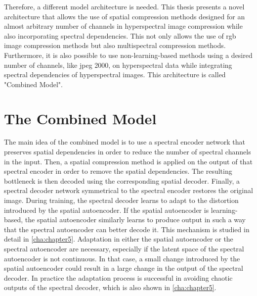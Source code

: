 Therefore, a different model architecture is needed. This thesis presents a novel architecture that allows the use of spatial compression methods designed for an almost arbitrary number of channels in hyperspectral image compression while also incorporating spectral dependencies. This not only allows the use of \ac{rgb} image compression methods but also multispectral compression methods. Furthermore, it is also possible to use non-learning-based methods using a desired number of channels, like \ac{jpeg} 2000, on hyperspectral data while integrating spectral dependencies of hyperspectral images. This architecture is called "Combined Model".
\section{The Combined Model}
The main idea of the combined model is to use a spectral encoder network that preserves spatial dependencies in order to reduce the number of spectral channels in the input. Then, a spatial compression method is applied on the output of that spectral encoder in order to remove the spatial dependencies. The resulting bottleneck is then decoded using the corresponding spatial decoder. Finally, a spectral decoder network symmetrical to the spectral encoder restores the original image. During training, the spectral decoder learns to adapt to the distortion introduced by the spatial autoencoder. If the spatial autoencoder is learning-based, the spatial autoencoder similarly learns to produce output in such a way that the spectral autoencoder can better decode it. This mechanism is studied in detail in \autoref{cha:chapter5}. Adaptation in either the spatial autoencoder or the spectral autoencoder are necessary, especially if the latent space of the spectral autoencoder is not continuous. In that case, a small change introduced by the spatial autoencoder could result in a large change in the output of the spectral decoder. In practice the adaptation process is successful in avoiding chaotic outputs of the spectral decoder, which is also shown in \autoref{cha:chapter5}.

